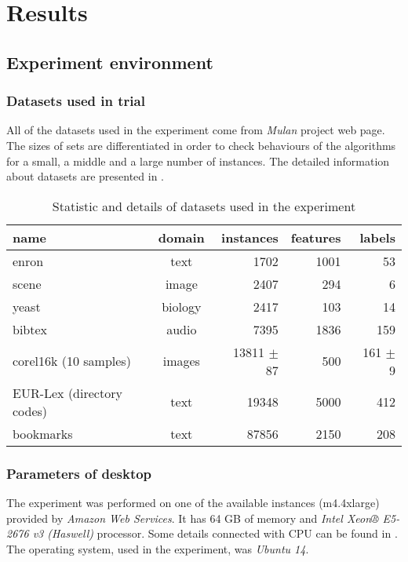 
\chapter{Results}

\section{Experiment environment}
\subsection{Datasets used in trial}

All of the datasets used in the experiment come from \textit{Mulan} project web page. The sizes of sets are differentiated in order to check behaviours of the algorithms for a small, a middle and a large number of instances. The detailed information about datasets are presented in . 

\begin{table}[h]
\centering
\caption{Statistic and details of datasets used in the experiment}
\label{tab:exp1}
    \begin{tabular}{l|c|r|r|r}
    name & domain & instances & features & labels \\ \hline \hline
    enron & text  &  1702  & 1001 &  53 \\
    scene & image &  2407  & 294 & 6 \\   
    yeast & biology & 2417 & 103 & 14 \\
    bibtex & audio & 7395 & 1836 & 159 \\
    corel16k (10 samples) & images & 13811 $\pm$ 87 & 500 & 161 $\pm$ 9\\
    EUR-Lex (directory codes) & text & 19348 & 5000 & 412 \\
    bookmarks & text & 87856 & 2150 & 208
    \end{tabular}
\end{table}

\subsection{Parameters of desktop}

The experiment was performed on one of the available instances (m4.4xlarge) provided by \textit{Amazon Web Services}. It has 64 GB of memory and \textit{Intel Xeon® E5-2676 v3 (Haswell)} processor. Some details connected with CPU can be found in . The operating system, used in the experiment, was \textit{Ubuntu 14}.

